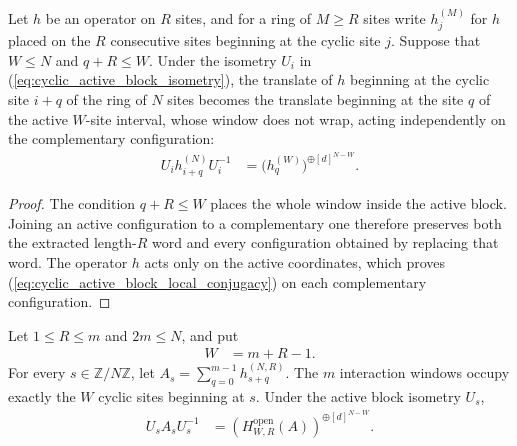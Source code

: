 \begin{lemma}
    \label{thm:cyclic_active_block_local_conjugacy}
    \leanok
    Let $h$ be an operator on $R$ sites, and for a ring of $M\geq R$ sites
    write $h_j^{(M)}$ for $h$ placed on the $R$ consecutive sites beginning at
    the cyclic site $j$.  Suppose that $W\leq N$ and $q+R\leq W$.  Under the
    isometry $U_i$ in (\ref{eq:cyclic_active_block_isometry}), the translate
    of $h$ beginning at the cyclic site $i+q$ of the ring of $N$ sites
    becomes the translate beginning at the site $q$ of the active $W$-site
    interval, whose window does not wrap, acting independently on the
    complementary configuration:
    \begin{align}
        U_i h_{i+q}^{(N)}U_i^{-1}
         & =\bigl(h_q^{(W)}\bigr)^{\oplus[d]^{N-W}}.
        \label{eq:cyclic_active_block_local_conjugacy}
    \end{align}
\end{lemma}

\begin{proof}
    \leanok
    The condition $q+R\leq W$ places the whole window inside the active
    block.  Joining an active configuration to a complementary one
    therefore preserves both the extracted length-$R$ word and every
    configuration obtained by replacing that word.  The operator $h$ acts
    only on the active coordinates, which proves
    (\ref{eq:cyclic_active_block_local_conjugacy}) on each complementary
    configuration.
\end{proof}

\begin{lemma}
    \label{thm:cyclic_knabe_block_open_parent_hamiltonian}
    \leanok
    Let $1\leq R\leq m$ and $2m\leq N$, and put
    \begin{align}
        W & =m+R-1.
        \label{eq:cyclic_knabe_active_volume}
    \end{align}
    For every $s\in\mathbb Z/N\mathbb Z$, let
    $A_s=\sum_{q=0}^{m-1}h_{s+q}^{(N,R)}$.  The $m$ interaction windows
    occupy exactly the $W$ cyclic sites beginning at $s$.  Under the active
    block isometry $U_s$,
    \begin{align}
        U_sA_sU_s^{-1}
         & =\left(H^{\mathrm{open}}_{W,R}(A)\right)^{\oplus[d]^{N-W}}.
        \label{eq:cyclic_knabe_block_open_hamiltonian}
    \end{align}
\end{lemma}

